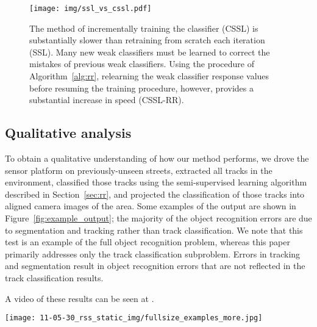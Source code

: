\documentclass[conference]{IEEEtran}
\begin{document}
\begin{figure}
  \centering
  \texttt{[image: img/ssl\_vs\_cssl.pdf]}
  \caption{The \naive method of incrementally training the classifier (CSSL) is substantially slower than retraining from scratch each iteration (SSL).  Many new weak classifiers must be learned to correct the mistakes of previous weak classifiers.  Using the procedure of Algorithm~\ref{alg:rr}, \ie relearning the weak classifier response values before resuming the training procedure, however, provides a substantial increase in speed (CSSL-RR).}
  \label{fig:cssl}
\end{figure}

\subsection{Qualitative analysis}
\label{sec:qual}
To obtain a qualitative understanding of how our method performs, we drove the sensor platform on previously-unseen streets, extracted all tracks in the environment, classified those tracks using the semi-supervised learning algorithm described in Section~\ref{sec:rr}, and projected the classification of those tracks into aligned camera images of the area.  Some examples of the output are shown in Figure~\ref{fig:example_output}; the majority of the object recognition errors are due to segmentation and tracking rather than track classification.  We note that this test is an example of the full object recognition problem, whereas this paper primarily addresses only the track classification subproblem.  Errors in tracking and segmentation result in object recognition errors that are not reflected in the track classification results.

A video of these results can be seen at \citep{video}.

\begin{figure*}
  \centering
  \texttt{[image: 11-05-30\_rss\_static\_img/fullsize\_examples\_more.jpg]}
  \caption{Track classifications in LIDAR data projected into aligned camera data for visualization.  Best viewed in color.  Cars are outlined in red, pedestrians in blue, bicyclists in green, and background (\ie classified as neither car, pedestrian, nor bicyclist) in gray.  Objects without outlines were not tracked.  Tracking and segmentation errors (beyond the scope of this paper) are the major cause of failures.  A video of these results can be seen at \citep{video}.}
  \label{fig:example_output}
\end{figure*}
\end{document}
